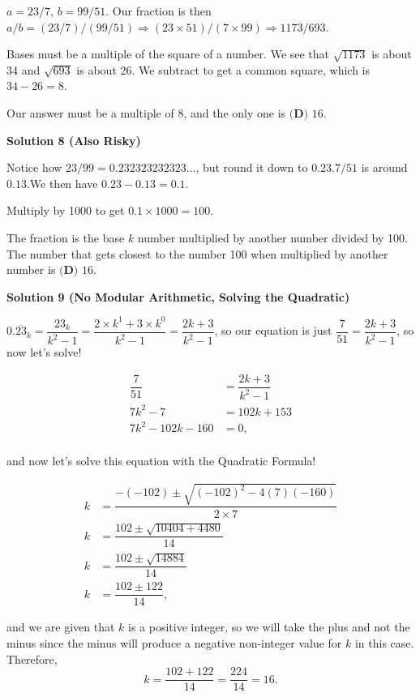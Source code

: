 \begin{enumerate}
 \( a = 23/7 \), \( b = 99/51 \). Our fraction is then \( a/b = (23/7) / (99/51) \Rightarrow (23 \times 51) / (7 \times 99) \Rightarrow 1173/693 \).

 Bases must be a multiple of the square of a number. We see that \( \sqrt{1173} \) is about 34 and \( \sqrt{693} \) is about 26. We subtract to get a common square, which is \( 34-26 = 8 \).

 Our answer must be a multiple of 8, and the only one is $\boxed{\textbf{(D) }16}$.

 



\textbf{Solution 8 (Also Risky)}

Notice how \( 23/99 = 0.232323232323\ldots \), but round it down to \( 0.23 \).\( 7/51 \) is around \( 0.13 \).We then have \( 0.23 - 0.13 = 0.1 \).

 Multiply by 1000 to get \( 0.1 \times 1000 = 100 \).

 The fraction is the base \( k \) number multiplied by another number divided by 100. The number that gets closest to the number 100 when multiplied by another number is $\boxed{\textbf{(D) }16}$.

 



\textbf{Solution 9 (No Modular Arithmetic, Solving the Quadratic)}

$0.\overline{23}_k=\dfrac{23_k}{k^2-1}=\dfrac{2\times k^1+3\times k^0}{k^2-1}=\dfrac{2k+3}{k^2-1}$, so our equation is just $\dfrac7{51}=\dfrac{2k+3}{k^2-1}$, so now let's solve!

 
 \begin{align*}     \dfrac7{51}&=\dfrac{2k+3}{k^2-1}\\     7k^2-7&=102k+153\\     7k^2-102k-160&=0,\\ \end{align*}


 and now let's solve this equation with the Quadratic Formula!

 
 \begin{align*}     k&=\dfrac{-(-102)\pm\sqrt{(-102)^2-4(7)(-160)}}{2\times7}\\     k&=\dfrac{102\pm\sqrt{10404+4480}}{14}\\     k&=\dfrac{102\pm\sqrt{14884}}{14}\\     k&=\dfrac{102\pm122}{14}, \end{align*}


 and we are given that $k$ is a positive integer, so we will take the plus and not the minus since the minus will produce a negative non-integer value for $k$ in this case. Therefore, 
 \[k=\dfrac{102+122}{14}=\dfrac{224}{14}=\boxed{16}.\]


\end{enumerate}

